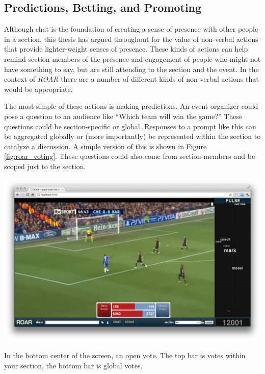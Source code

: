 

\subsection{Predictions, Betting, and Promoting}

Although chat is the foundation of creating a sense of presence with other people in a section, this thesis has argued throughout for the value of non-verbal actions that provide lighter-weight senses of presence. These kinds of actions can help remind section-members of the presence and engagement of people who might not have something to say, but are still attending to the section and the event. In the context of \emph{ROAR} there are a number of different kinds of non-verbal actions that would be appropriate.

The most simple of these actions is making predictions. An event organizer could pose a question to an audience like ``Which team will win the game?'' These questions could be section-specific or global. Responses to a prompt like this can be aggregated globally or (more importantly) be represented within the section to catalyze a discussion. A simple version of this is shown in Figure \ref{fig:roar_voting}. These questions could also come from section-members and be scoped just to the section.

\begin{marginfigure}
	\includegraphics{figures/roar/voting.png}
	\caption{In the bottom center of the screen, an open vote. The top bar is votes within your section, the bottom bar is global votes.}
	\label{fig:roar_voting}
\end{marginfigure}

